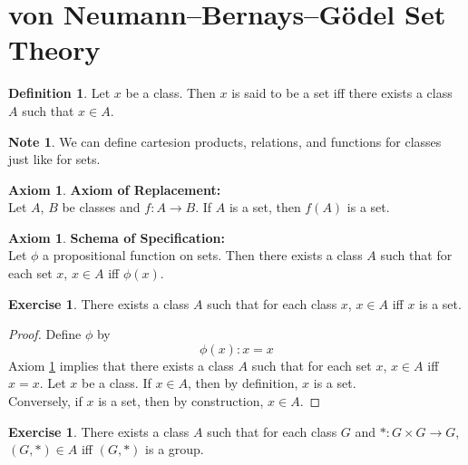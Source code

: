\documentclass{book}
\theoremstyle{definition}
\newtheorem{defn}[definition]{Definition}
\newtheorem{ax}[definition]{Axiom}
\newtheorem{note}[definition]{Note}
\newtheorem{ex}[definition]{Exercise}
\newcommand{\lex}[1]{\label{ex:#1}}
\newcommand{\ld}[1]{\label{defn:#1}}
\newcommand{\lax}[1]{\label{ax:#1}}
\newcommand{\rax}[1]{Axiom \ref{ax:#1}}
\DeclareMathOperator*{\0}{\mbf{0}}
\DeclareMathOperator*{\1}{\mbf{1}}
\begin{document}
	\section{von Neumann–Bernays–Gödel Set Theory}
	
	\begin{defn} \ld{11001} 
		Let $x$ be a class. Then $x$ is said to be a set iff there exists a class $A$ such that $x \in A$. 
	\end{defn}

	\begin{note}
		We can define cartesion products, relations, and functions for classes just like for sets. 
	\end{note}
	
	\begin{ax} \lax{11001.1} \textbf{Axiom of Replacement:}  \\
		Let $A$, $B$ be classes and $f:A \rightarrow B$. If $A$ is a set, then $f(A)$ is a set. 
	\end{ax}

	\begin{ax} \lax{11002} \textbf{Schema of Specification:}  \lax{11002}\\
		Let $\phi$ a propositional function on sets. Then there exists a class $A$ such that for each set $x$, $x \in A$ iff $\phi(x)$. 
	\end{ax}
	
	\begin{ex} \lex{11003}
		There exists a class $A$ such that for each class $x$, $x \in A$ iff $x$ is a set.
	\end{ex}
	
	\begin{proof}
		Define $\phi$ by $$\phi(x) : x = x$$ 
		\rax{11002} implies that there exists a class $A$ such that for each set $x$, $x \in A$ iff $x = x$. Let $x$ be a class. If $x \in A$, then by definition, $x$ is a set. \\
		Conversely, if $x$ is a set, then by construction, $x \in A$.
	\end{proof}
	
	\begin{ex} \lex{11004}
		There exists a class $A$ such that for each class $G$ and $*: G \times G \rightarrow G$, $(G, *) \in A$ iff $(G, *)$ is a group.
	\end{ex}
	
\end{document}
